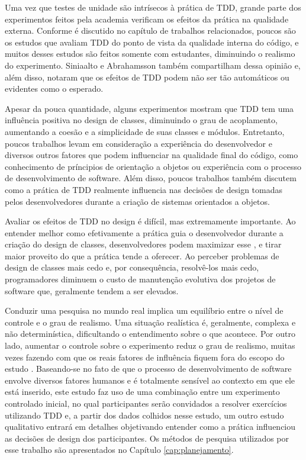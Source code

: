 Uma vez que testes de unidade são intrísecos à prática de TDD, 
grande parte dos experimentos feitos pela academia verificam os
efeitos da prática na qualidade externa. Conforme é discutido no capítulo de
trabalhos relacionados, poucos são os estudos que avaliam TDD do
ponto de vista da qualidade interna do código, e muitos desses estudos
são feitos somente com estudantes, diminuindo o realismo do experimento. 
Siniaalto e Abrahamsson \cite{alarming-results} também
compartilham dessa opinião e, além disso, notaram que os efeitos de TDD podem 
não ser tão automáticos ou evidentes como o esperado.

Apesar da pouca quantidade, alguns experimentos mostram que TDD tem uma influência
positiva no design de classes, diminuindo o grau de acoplamento, aumentando
a coesão e a simplicidade de suas classes e módulos. Entretanto, poucos trabalhos
levam em consideração a experiência do desenvolvedor e diversos
outros fatores que podem influenciar na qualidade final do código, como conhecimento
de príncipios de orientação a objetos ou experiência com o processo de 
desenvolvimento de software. Além disso, poucos trabalhos também discutem como
a prática de TDD realmente influencia 
nas decisões de design tomadas pelos desenvolvedores durante a criação de sistemas 
orientados a objetos.

Avaliar os efeitos de TDD no design é difícil, mas extremamente importante.
Ao entender melhor como efetivamente a prática guia o desenvolvedor durante
a criação do design de classes, desenvolvedores podem maximizar esse ,
e tirar maior proveito do que a prática tende a oferecer. Ao perceber 
problemas de design de classes mais cedo e, por consequência, resolvê-los
mais cedo, programadores diminuem o custo de manutenção evolutiva dos projetos
de software que, geralmente tendem a ser elevados.

Conduzir uma pesquisa no mundo real implica um equilíbrio entre o nível de controle
e o grau de realismo. Uma situação realística é, geralmente, complexa e 
não determinística, dificultando o entendimento sobre o que acontece. Por outro
lado, aumentar o controle sobre o experimento reduz o grau de realismo, muitas
vezes fazendo com que os reais fatores de influência fiquem fora do escopo do 
estudo \cite{guidelines-case-study}.
Baseando-se no fato de que o processo de desenvolvimento de software envolve 
diversos fatores humanos e é totalmente sensível ao contexto em que ele está 
inserido, 
este estudo faz uso de uma combinação entre um experimento controlado inicial, 
no qual participantes serão convidados a resolver exercícios utilizando TDD e, 
a partir dos dados colhidos nesse estudo, um outro estudo qualitativo entrará em 
detalhes objetivando entender como a prática influenciou as decisões de design 
dos participantes. Os métodos de pesquisa utilizados por
esse trabalho são apresentados no Capítulo \ref{cap:planejamento}.

